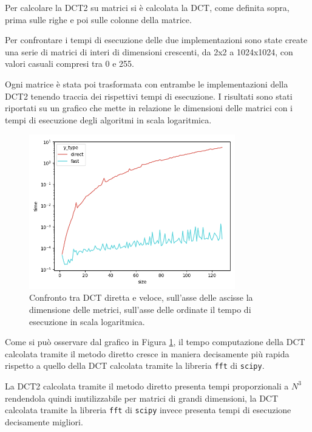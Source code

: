 \documentclass[a4paper, 12pt]{article}
\begin{document}
Per calcolare la DCT2 su matrici si è calcolata la DCT, come definita sopra, prima
sulle righe e poi sulle colonne della matrice.

Per confrontare i tempi di esecuzione delle due implementazioni sono state
create una serie di matrici di interi di dimensioni crescenti, da 2x2 a
1024x1024, con valori casuali compresi tra 0 e 255. 

Ogni matrice è stata poi trasformata con entrambe le implementazioni della DCT2
tenendo traccia dei rispettivi tempi di esecuzione. I risultati sono stati
riportati su un grafico che mette in relazione le dimensioni delle matrici con i
tempi di esecuzione degli algoritmi in scala logaritmica.

\begin{figure}[H]
  \centering
  \includegraphics[width=0.8\textwidth]{../test/benchmark-results/bench-incremental-0.png}
  \caption{Confronto tra DCT diretta e veloce, sull'asse delle ascisse la
    dimensione delle metrici, sull'asse delle ordinate il tempo di esecuzione in
    scala logaritmica.}
  \label{fig:incremental-benchmark}
\end{figure}

Come si può osservare dal grafico in Figura
\ref{fig:incremental-benchmark}, il tempo computazione della DCT calcolata
tramite il metodo diretto cresce in maniera decisamente più rapida rispetto a
quello della DCT calcolata tramite la libreria \texttt{fft} di \texttt{scipy}.

La DCT2 calcolata tramite il metodo diretto presenta tempi proporzionali a $N^3$
rendendola quindi inutilizzabile per matrici di grandi dimensioni, la DCT calcolata
tramite la libreria \texttt{fft} di \texttt{scipy} invece presenta tempi di esecuzione 
decisamente migliori.
\end{document}
